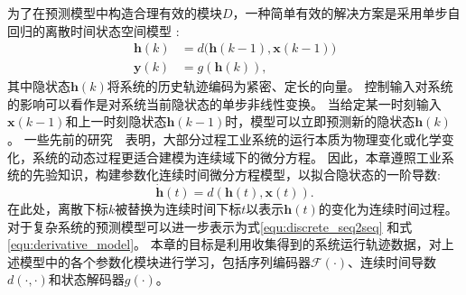 为了在预测模型中构造合理有效的模块$D$，一种简单有效的解决方案是采用单步自回归的离散时间状态空间模型 \cite{4019326}:
\begin{equation}
    \begin{aligned}
\boldsymbol{h}(k)&=d\big(\boldsymbol{h}(k-1), \boldsymbol{x}(k-1)\big)\\
\boldsymbol{y}(k)&=g(\boldsymbol{h}(k)),
    \end{aligned}
\end{equation}
其中隐状态$\boldsymbol{h}(k)$将系统的历史轨迹编码为紧密、定长的向量。
控制输入对系统的影响可以看作是对系统当前隐状态的单步非线性变换。
当给定某一时刻输入$\boldsymbol{x}(k-1)$和上一时刻隐状态$\boldsymbol{h}(k-1)$时，模型可以立即预测新的隐状态$\boldsymbol{h}(k)$。
一些先前的研究~\cite{CHAI201661}~\cite{KIM2004403}表明，大部分过程工业系统的运行本质为物理变化或化学变化，系统的动态过程更适合建模为连续域下的微分方程。
因此，本章遵照工业系统的先验知识，构建参数化连续时间微分方程模型，以拟合隐状态的一阶导数:
\begin{equation}
    \label{equ:derivative_model}
    \dot{\boldsymbol h}(t) = d(\boldsymbol{h}(t), \boldsymbol x(t)).
\end{equation}
在此处，离散下标$k$被替换为连续时间下标$t$以表示$\boldsymbol{h}(t)$的变化为连续时间过程。
对于复杂系统的预测模型可以进一步表示为式\eqref{equ:discrete_seq2seq} 和式 \eqref{equ:derivative_model}。
本章的目标是利用收集得到的系统运行轨迹数据，对上述模型中的各个参数化模块进行学习，包括序列编码器$\mathcal{F}(\cdot)$、连续时间导数$d(\cdot,\cdot)$和状态解码器$g(\cdot)$。
